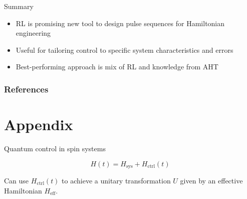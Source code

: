 \documentclass{beamer}
\begin{document}
\begin{frame}{Summary}

\begin{itemize}
    \item RL is promising new tool to design pulse sequences for Hamiltonian engineering
    \item Useful for tailoring control to specific system characteristics and errors
    \item Best-performing approach is mix of RL and knowledge from AHT
\end{itemize}

\end{frame}

\begin{frame}[allowframebreaks]
\frametitle{References}

\printbibliography

\end{frame}
















\section{Appendix}


\begin{frame}{Quantum control in spin systems}

\[
    H(t) = H_{\text{sys}} + H_{\text{ctrl}}(t)
\]

Can use $H_{\text{ctrl}}(t)$ to achieve
a unitary transformation $U$ given by an effective Hamiltonian $H_\text{eff}$.


\begin{figure}
\centering

\end{figure}

\end{frame}
\end{document}
